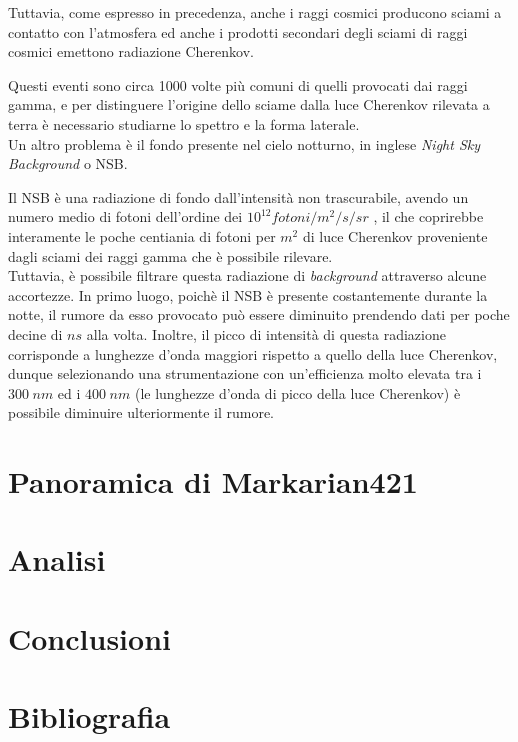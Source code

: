 \documentclass[10pt]{article}
\begin{document}
Tuttavia, come espresso in precedenza, anche i raggi cosmici producono sciami a contatto con l'atmosfera ed anche i prodotti secondari degli sciami di raggi cosmici emettono radiazione Cherenkov.

Questi eventi sono circa 1000 volte più comuni \cite{GBGrA} di quelli provocati dai raggi gamma, e per distinguere l'origine dello sciame dalla luce Cherenkov rilevata a terra è necessario studiarne lo spettro e la forma laterale.
\\
Un altro problema è il fondo presente nel cielo notturno, in inglese \textit{Night Sky Background} o NSB.

Il NSB è una radiazione di fondo dall'intensità non trascurabile, avendo un numero medio di fotoni dell'ordine dei $ 10^{12} fotoni/\unit{m}^2/\unit{s}/\unit{sr}$ \cite{GBGrA}, il che coprirebbe interamente le poche centiania di fotoni per $ \unit{m}^2 $ di luce Cherenkov proveniente dagli sciami dei raggi gamma che è possibile rilevare.
\\
Tuttavia, è possibile filtrare questa radiazione di \textit{background} attraverso alcune accortezze. In primo luogo, poichè il NSB è presente costantemente durante la notte, il rumore da esso provocato può essere diminuito prendendo dati per poche decine di $ \unit{ns} $ alla volta. Inoltre, il picco di intensità di questa radiazione corrisponde a lunghezze d'onda maggiori rispetto a quello della luce Cherenkov, dunque selezionando una strumentazione con un'efficienza molto elevata tra i $ 300\hspace{3pt}\unit{nm} $ ed i $ 400\hspace{3pt}\unit{nm} $ (le lunghezze d'onda di picco della luce Cherenkov) è possibile diminuire ulteriormente il rumore.


\newpage

\section{Panoramica di Markarian421}

\newpage

\section{Analisi}

\newpage

\section{Conclusioni}

\newpage

\section{Bibliografia}
\printbibliography
\end{document}
